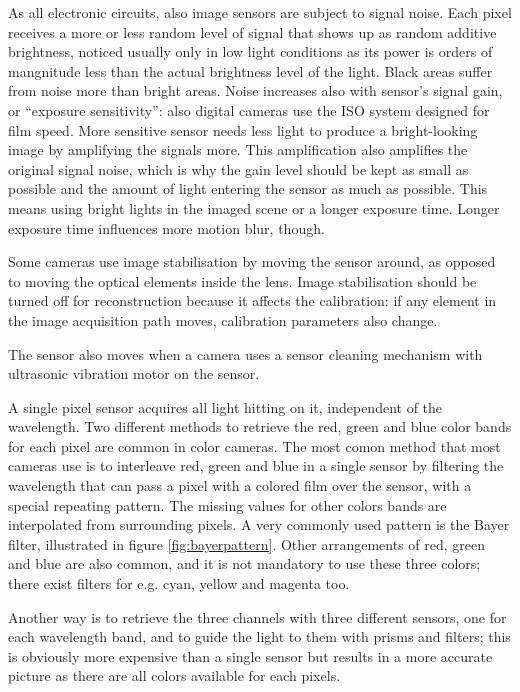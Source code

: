 
As all electronic circuits, also image sensors are subject to signal noise.
Each pixel receives a more or less random level of signal that shows up as random additive brightness, noticed usually only in low light conditions as its power is orders of mangnitude less than the actual brightness level of the light.
Black areas suffer from noise more than bright areas.
Noise increases also with sensor's signal gain, or ``exposure sensitivity'': also digital cameras use the ISO system designed for film speed.
More sensitive sensor needs less light to produce a bright-looking image by amplifying the signals more.
This amplification also amplifies the original signal noise, which is why the gain level should be kept as small as possible and the amount of light entering the sensor as much as possible.
This means using bright lights in the imaged scene or a longer exposure time.
Longer exposure time influences more motion blur, though.


Some cameras use image stabilisation by moving the sensor around, as opposed to moving the optical elements inside the lens.
Image stabilisation should be turned off for reconstruction because it affects the calibration: if any element in the image acquisition path moves, calibration parameters also change.

The sensor also moves when a camera uses a sensor cleaning mechanism with ultrasonic vibration motor on the sensor.


A single pixel sensor acquires all light hitting on it, independent of the wavelength.
Two different methods to retrieve the red, green and blue color bands for each pixel are common in color cameras.
The most comon method that most cameras use is to interleave red, green and blue in a single sensor by filtering the wavelength that can pass a pixel with a colored film over the sensor, with a special repeating pattern.
The missing values for other colors bands are interpolated from surrounding pixels.
A very commonly used pattern is the Bayer filter, illustrated in figure \ref{fig:bayerpattern}.
Other arrangements of red, green and blue are also common, and it is not mandatory to use these three colors; there exist filters for e.g. cyan, yellow and magenta too.

Another way is to retrieve the three channels with three different sensors, one for each wavelength band, and to guide the light to them with prisms and filters; this is obviously more expensive than a single sensor but results in a more accurate picture as there are all colors available for each pixels.

